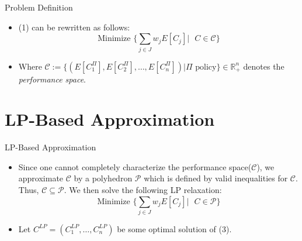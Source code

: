 \documentclass{beamer}
\begin{document}
\begin{frame}{Problem Definition}
    \begin{itemize}
        \justifying
        \item (1) can be rewritten as follows:
        \vspace{0.8cm}
        \begin{equation}
        \text{Minimize } \bigg\{\sum\limits_{j\in J} w_j E[C_j] \bigg\vert \text{ } C \in \mathscr{C} \bigg\}
        \end{equation}
        \vspace{0.8cm}
        \item[] Where $\mathscr{C}:=\{(E[C_1^{\Pi}],E[C_2^{\Pi}],\dots,E[C_n^{\Pi}]) \vert \Pi \text{ policy} \} \in \mathbb{R}_{+}^n$ denotes the \textit{performance space}.
    \end{itemize}
\end{frame}

\section{LP-Based Approximation}
\begin{frame}{LP-Based Approximation}
    \begin{itemize}
        \justifying
        \item Since one cannot completely characterize the performance space($\mathscr{C}$), we approximate $\mathscr{C}$ by a polyhedron $\mathscr{P}$ which is defined by valid inequalities for $\mathscr{C}$. Thus, $\pmb{\mathscr{C} \subseteq \mathscr{P}}$. We then solve the following LP relaxation:
        \vspace{0.8cm}
        \begin{equation}
        \text{Minimize } \bigg\{\sum\limits_{j\in J} w_j E[C_j] \bigg\vert \text{ } C \in \mathscr{P} \bigg\}
        \end{equation}
        \vspace{0.8cm}
        \item Let $C^{LP}=(C_1^{LP},\dots,C_n^{LP})$ be some optimal solution of (3).
    \end{itemize}
\end{frame}
\end{document}
